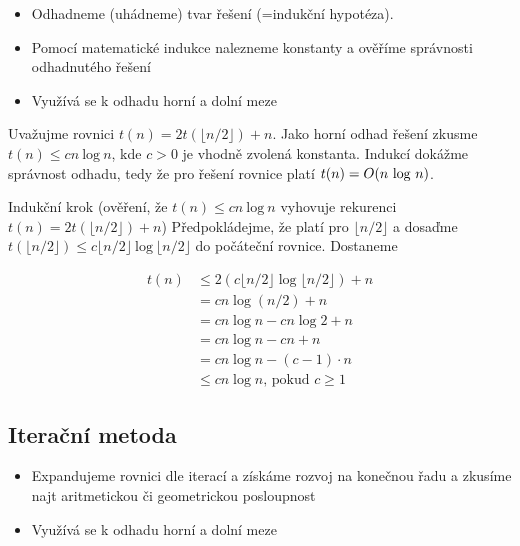 \documentclass{szzclass}
\begin{document}
\begin{itemize}
    \item Odhadneme (uhádneme) tvar řešení (=indukční hypotéza).
    \item Pomocí matematické indukce nalezneme konstanty a ověříme
    správnosti odhadnutého řešení
    \item Využívá se k odhadu horní a dolní meze
\end{itemize}

Uvažujme rovnici $t(n) = 2t(\lfloor n/2 \rfloor) + n$.
Jako horní odhad řešení zkusme
$t(n) \leq cn~\text{log}~n$, kde $c > 0$ je vhodně zvolená konstanta.
Indukcí dokážme správnost odhadu, tedy že pro řešení rovnice platí
$t(n) =\nolinebreak O(n~\text{log}~n)$.

Indukční krok
(ověření, že $t(n) \leq cn~\text{log}~n$ vyhovuje rekurenci $t(n) = 2t(\lfloor n/2 \rfloor) + n$)
Předpokládejme, že platí pro $\lfloor n/2 \rfloor$ a dosaďme
$t(\lfloor n/2 \rfloor) \leq c \lfloor n/2 \rfloor~\text{log}~ \lfloor n/2 \rfloor$ do počáteční rovnice. Dostaneme

\begin{align*}
t(n) &\leq 2(c \lfloor n/2 \rfloor \log{\lfloor n/2 \rfloor}) + n\\
     &= cn \log{(n/2)} + n\\
     &= cn \log{ n} - cn \log{} 2 + n\\
     &= cn \log{ n} - cn + n\\
     &= cn \log{ n} - (c - 1)\cdot n\\
     &\leq cn\log{n}\text{, pokud }c \geq 1
\end{align*}



\subsection{Iterační metoda}

\begin{itemize}
    \item Expandujeme rovnici dle iterací a získáme rozvoj na konečnou řadu a zkusíme najt aritmetickou či geometrickou posloupnost
    \item Využívá se k odhadu horní a dolní meze
\end{itemize}
\end{document}
